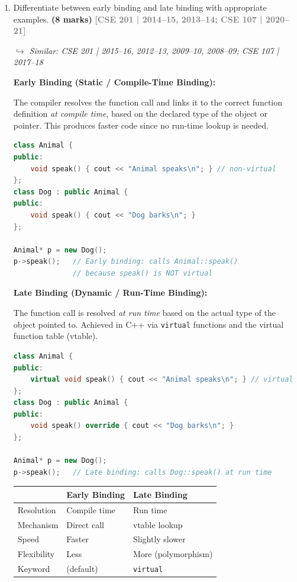 \documentclass[12pt,a3paper]{article}
\newcommand{\yr}[1]{\hfill\textcolor{gray}{\small\textbf{[#1]}}}
\newcommand{\mk}[1]{\textcolor{orange!70!black}{\small\textbf{(#1 marks)}}}
\newcommand{\variant}[1]{\par\vspace{1pt}\textcolor{blue!50!black}%
  {\footnotesize\textit{$\hookrightarrow$ Similar: #1}}}
\begin{document}
\begin{enumerate}
\item Differentiate between early binding and late binding with appropriate examples. \mk{8}
\yr{CSE 201 | 2014--15, 2013--14; CSE 107 | 2020--21}
\variant{CSE 201 | 2015--16, 2012--13, 2009--10, 2008--09; CSE 107 | 2017--18}

\begin{tcolorbox}[enhanced,breakable,ansbox,colback=cA!4,colframe=cA,
  boxrule=0.8pt,arc=5pt,
  title={\textbf{Answer}},fonttitle=\bfseries\color{white},colbacktitle=cA]

\textbf{Early Binding (Static / Compile-Time Binding):}

The compiler resolves the function call and links it to the correct
function definition \emph{at compile time}, based on the declared
type of the object or pointer.  This produces faster code since no
run-time lookup is needed.

\begin{lstlisting}[language=C++]
class Animal {
public:
    void speak() { cout << "Animal speaks\n"; } // non-virtual
};
class Dog : public Animal {
public:
    void speak() { cout << "Dog barks\n"; }
};

Animal* p = new Dog();
p->speak();   // Early binding: calls Animal::speak()
              // because speak() is NOT virtual
\end{lstlisting}

\medskip
\textbf{Late Binding (Dynamic / Run-Time Binding):}

The function call is resolved \emph{at run time} based on the actual
type of the object pointed to.  Achieved in C++ via \texttt{virtual}
functions and the virtual function table (vtable).

\begin{lstlisting}[language=C++]
class Animal {
public:
    virtual void speak() { cout << "Animal speaks\n"; } // virtual
};
class Dog : public Animal {
public:
    void speak() override { cout << "Dog barks\n"; }
};

Animal* p = new Dog();
p->speak();   // Late binding: calls Dog::speak() at run time
\end{lstlisting}

\begin{center}
\small
\begin{tabular}{@{}lll@{}}
\toprule
& \textbf{Early Binding} & \textbf{Late Binding} \\ \midrule
Resolution & Compile time & Run time \\
Mechanism  & Direct call  & vtable lookup \\
Speed      & Faster       & Slightly slower \\
Flexibility & Less         & More (polymorphism) \\
Keyword    & (default)    & \texttt{virtual} \\
\bottomrule
\end{tabular}
\end{center}


\end{tcolorbox}
\end{enumerate}
\end{document}
